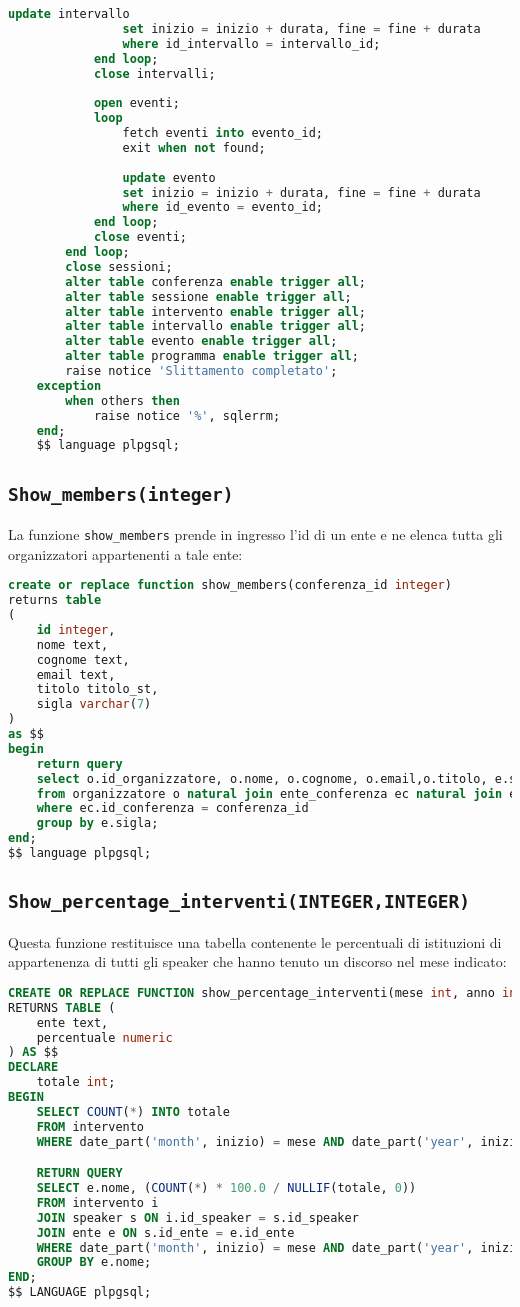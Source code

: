 \begin{lstlisting}[language=SQL,style=mystyle]
				update intervallo
				set inizio = inizio + durata, fine = fine + durata
				where id_intervallo = intervallo_id;
			end loop;
			close intervalli;
			
			open eventi;
			loop
				fetch eventi into evento_id;
				exit when not found;
	
				update evento
				set inizio = inizio + durata, fine = fine + durata
				where id_evento = evento_id;
			end loop;
			close eventi;
		end loop;
		close sessioni;
        alter table conferenza enable trigger all;
        alter table sessione enable trigger all;
        alter table intervento enable trigger all;
        alter table intervallo enable trigger all;
        alter table evento enable trigger all;
        alter table programma enable trigger all;
        raise notice 'Slittamento completato';
	exception
		when others then
			raise notice '%', sqlerrm;
	end;
	$$ language plpgsql;
\end{lstlisting}

\subsection{\texttt{Show\_members(integer)}}
La funzione \texttt{show\_members} prende in ingresso l'id di un ente e ne elenca tutta gli organizzatori appartenenti a tale ente:
\begin{lstlisting}[language=SQL,style=mystyle]
create or replace function show_members(conferenza_id integer)
returns table 
(
    id integer, 
    nome text, 
    cognome text, 
    email text,
    titolo titolo_st, 
    sigla varchar(7)
) 
as $$
begin
    return query
    select o.id_organizzatore, o.nome, o.cognome, o.email,o.titolo, e.sigla
    from organizzatore o natural join ente_conferenza ec natural join ente e  
    where ec.id_conferenza = conferenza_id
    group by e.sigla;
end;
$$ language plpgsql;
\end{lstlisting}
\subsection{\texttt{Show\_percentage\_interventi(INTEGER,INTEGER)}}
Questa funzione restituisce una tabella contenente le percentuali di istituzioni di appartenenza di tutti gli speaker che hanno tenuto un discorso nel mese indicato:
\begin{lstlisting}[language=SQL,style=mystyle]
CREATE OR REPLACE FUNCTION show_percentage_interventi(mese int, anno int)
RETURNS TABLE (
    ente text,
    percentuale numeric
) AS $$
DECLARE
    totale int;
BEGIN
    SELECT COUNT(*) INTO totale
    FROM intervento
    WHERE date_part('month', inizio) = mese AND date_part('year', inizio) = anno;

    RETURN QUERY
    SELECT e.nome, (COUNT(*) * 100.0 / NULLIF(totale, 0))
    FROM intervento i
    JOIN speaker s ON i.id_speaker = s.id_speaker
    JOIN ente e ON s.id_ente = e.id_ente
    WHERE date_part('month', inizio) = mese AND date_part('year', inizio) = anno
    GROUP BY e.nome;
END;
$$ LANGUAGE plpgsql;
\end{lstlisting}

